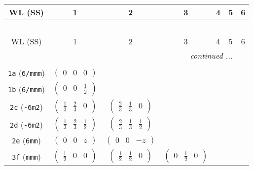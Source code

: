 \documentclass[fleqn,9pt,landscape]{jsarticle}
\begin{document}
\begin{center}
\renewcommand{\arraystretch}{1.2}
\begin{longtable}{ccccccc}
 \hline \hline
WL (SS) & 1 & 2 & 3 & 4 & 5 & 6 \\ \hline \endfirsthead

\multicolumn{6}{l}{\tablename\ \thetable{}} \\
 \hline \hline
WL (SS) & 1 & 2 & 3 & 4 & 5 & 6 \\ \hline \endhead

 \hline \hline
\multicolumn{6}{r}{\footnotesize\it continued ...} \\ \endfoot

 \hline \hline
\multicolumn{6}{r}{} \\ \endlastfoot

{\tt 1a} ({\tt 6/mmm}) & $ \begin{pmatrix} 0 & 0 & 0 \end{pmatrix} $ & $  $ & $  $ & $  $ & $  $ & $  $ \\ \hline
{\tt 1b} ({\tt 6/mmm}) & $ \begin{pmatrix} 0 & 0 & \frac{1}{2} \end{pmatrix} $ & $  $ & $  $ & $  $ & $  $ & $  $ \\ \hline
{\tt 2c} ({\tt -6m2}) & $ \begin{pmatrix} \frac{1}{3} & \frac{2}{3} & 0 \end{pmatrix} $ & $ \begin{pmatrix} \frac{2}{3} & \frac{1}{3} & 0 \end{pmatrix} $ & $  $ & $  $ & $  $ & $  $ \\ \hline
{\tt 2d} ({\tt -6m2}) & $ \begin{pmatrix} \frac{1}{3} & \frac{2}{3} & \frac{1}{2} \end{pmatrix} $ & $ \begin{pmatrix} \frac{2}{3} & \frac{1}{3} & \frac{1}{2} \end{pmatrix} $ & $  $ & $  $ & $  $ & $  $ \\ \hline
{\tt 2e} ({\tt 6mm}) & $ \begin{pmatrix} 0 & 0 & z \end{pmatrix} $ & $ \begin{pmatrix} 0 & 0 & - z \end{pmatrix} $ & $  $ & $  $ & $  $ & $  $ \\ \hline
{\tt 3f} ({\tt mmm}) & $ \begin{pmatrix} \frac{1}{2} & 0 & 0 \end{pmatrix} $ & $ \begin{pmatrix} \frac{1}{2} & \frac{1}{2} & 0 \end{pmatrix} $ & $ \begin{pmatrix} 0 & \frac{1}{2} & 0 \end{pmatrix} $ & $  $ & $  $ & $  $ \\ \hline

\end{longtable}
\end{center}
\end{document}

